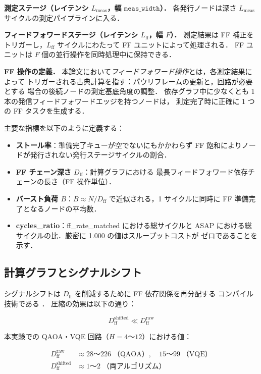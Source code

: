 \documentclass[journal,10pt,twocolumn]{IEEEtran}
\begin{document}
\textbf{測定ステージ（レイテンシ $L_{\mathrm{meas}}$，幅 $\texttt{meas\_width}$）．}
各発行ノードは深さ $L_{\mathrm{meas}}$ サイクルの測定パイプラインに入る．

\textbf{フィードフォワードステージ（レイテンシ $L_{\mathrm{ff}}$，幅 $F$）．}
測定結果は FF 補正をトリガーし，$L_{\mathrm{ff}}$ サイクルにわたって
FF ユニットによって処理される．
FF ユニットは $F$ 個の並行操作を同時処理中に保持できる．

\textbf{FF 操作の定義．}
本論文において\textit{フィードフォワード操作}とは，各測定結果によって
トリガーされる古典計算を指す：パウリフレームの更新と，回路が必要とする
場合の後続ノードの測定基底角度の調整．
依存グラフ中に少なくとも 1 本の発信フィードフォワードエッジを持つノードは，
測定完了時に正確に 1 つの FF タスクを生成する．

主要な指標を以下のように定義する：
\begin{itemize}
\item \textbf{ストール率}：準備完了キューが空でないにもかかわらず
  FF 飽和によりノードが発行されない発行ステージサイクルの割合．
\item \textbf{FF チェーン深さ $D_{\mathrm{ff}}$}：計算グラフにおける
  最長フィードフォワード依存チェーンの長さ（FF 操作単位）．
\item \textbf{バースト負荷 $B$}：$B \approx N / D_{\mathrm{ff}}$
  で近似される，1 サイクルに同時に FF 準備完了となるノードの平均数．
\item \textbf{cycles\_ratio}：ff\_rate\_matched における総サイクルと
  ASAP における総サイクルの比．厳密に 1.000 の値はスループットコストが
  ゼロであることを示す．
\end{itemize}

\subsection{計算グラフとシグナルシフト}

シグナルシフトは $D_{\mathrm{ff}}$ を削減するために FF 依存関係を再分配する
コンパイル技術である \cite{DanosKashefi2006,Broadbent2009}．
圧縮の効果は以下の通り：

\begin{equation}
  D_{\mathrm{ff}}^{\mathrm{shifted}} \ll D_{\mathrm{ff}}^{\mathrm{raw}}
\end{equation}

本実験での QAOA・VQE 回路（$H = 4$〜$12$）における値：

\begin{align}
  D_{\mathrm{ff}}^{\mathrm{raw}} &\approx 28\text{〜}226
    \;\text{（QAOA）},\quad 15\text{〜}99\;\text{（VQE）} \\
  D_{\mathrm{ff}}^{\mathrm{shifted}} &\approx 1\text{〜}2
    \;\text{（両アルゴリズム）}
\end{align}
\end{document}

